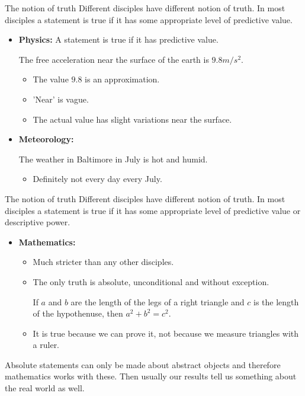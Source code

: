 \documentclass{beamer}
\begin{document}
\begin{frame}[t]{The notion of truth}
Different disciples have different notion of truth. In most disciples a statement is true if it has some appropriate level of predictive value.
\begin{itemize}
\item<2-3> \textbf{Physics:} A statement is true if it has predictive value.
\begin{block}{}
The free acceleration near the surface of the earth is $9.8 m/s^2$.
\end{block}
\begin{itemize}
\item<2-3> The value $9.8$ is an approximation.
\item<2-3> 'Near' is vague.
\item<2-3> The actual value has slight variations near the surface.
\end{itemize}
\item<3> \textbf{Meteorology:}
\begin{block}{} The weather in Baltimore in July is hot and humid.\end{block}
\begin{itemize}
\item<3> Definitely not every day every July.
\end{itemize}

\end{itemize}
\end{frame}

\begin{frame}[t]{The notion of truth}
Different disciples have different notion of truth. In most disciples a statement is true if it has some appropriate level of predictive value or descriptive power.
\begin{itemize}
\item \textbf{Mathematics:}
\begin{itemize}
\item Much stricter than any other disciples.
\item The only truth is absolute, unconditional and without exception.
\begin{theorem}
If $a$ and $b$ are the length of the legs of a right triangle and $c$ is the length of the hypothenuse, then $a^2+b^2=c^2$.
\end{theorem}\pause
\item It is true because we can prove it, not because we measure triangles with a ruler.
\end{itemize}
\end{itemize}\pause
Absolute statements can only be made about abstract objects and therefore mathematics works with these. Then usually our results tell us something about the real world as well.
\end{frame}
\end{document}
